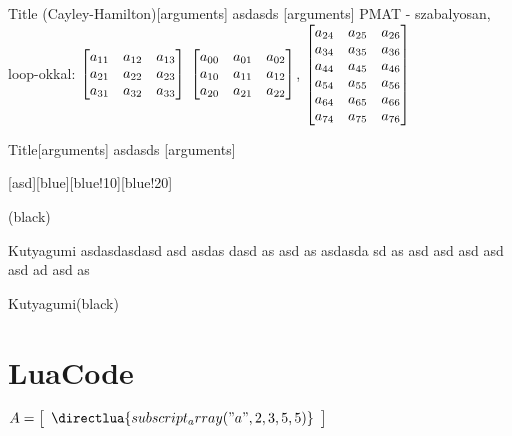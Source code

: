 \documentclass[12pt]{article}
\begin{document}

    \begin{pcolorbox}{Title (Cayley-Hamilton)}[arguments]
        asdasds
    [arguments]
    PMAT - szabalyosan, loop-okkal:
    $\bmqty{\xmat*{a}{3}{3}}$
    $\bmqty{\pmat*{a}{3}{3}}$,
    $\bmqty{\pmat*{a}[2]{8}[4]{7}}$
    \end{pcolorbox}

    \begin{pcolorbox}{Title}[arguments]\matlab
        asdasds
    [arguments]\matlab
    \end{pcolorbox}

    \begin{pcolorbox}[notitle]{}[asd][blue][blue!10][blue!20]
        \lipsum[1]
    \end{pcolorbox}

    \begin{pcbexample}
        \lipsum[2]
    \end{pcbexample}

    \begin{cTheorem}

    \end{cTheorem}

    \color{black}
    (black)

    \Hiba*[blue]
    Kutyagumi asdasdasdasd asd asdas dasd as asd as
    asdasda sd as asd asd asd asd asd ad asd as

    \color{black}
    Kutyagumi(black)



\listoftodosangol

\begin{tcolorbox}[breakable,title=My breakable box]
  \lipsum[1-6]
\end{tcolorbox}



\Normal\n
\section{LuaCode}
\newcommand{\luapmat}[4]{%
  $\directlua{ paren_array(\luatexluaescapestring{#1},\luatexluaescapestring{#2},\luatexluaescapestring{#3},\luatexluaescapestring{#4}) }$
}


\newcommand*{\mycommand}{%
}

\mycommand


\bigskip
$
A = \left[ \begin{array}{*{5}{c}}
       \directlua{ subscript_array("a",2,3,5,5 ) }
    \end{array} \right]
$

$
\luapmat{2}{3}{4}{4}
$
\end{document}
